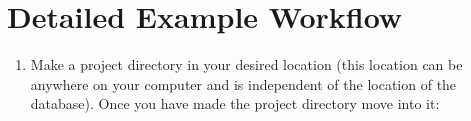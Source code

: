 \documentclass{article}
\def\code#1{\texttt{#1}}
\begin{document}
\section{Detailed Example Workflow}
    \begin{enumerate}[itemsep=12pt]
        \item Make a project directory in your desired location (this location can be anywhere on your computer and is independent of the location of the database). Once you have made the project directory move into it:
        \vspace{4pt}
        

\end{enumerate}
\end{document}
